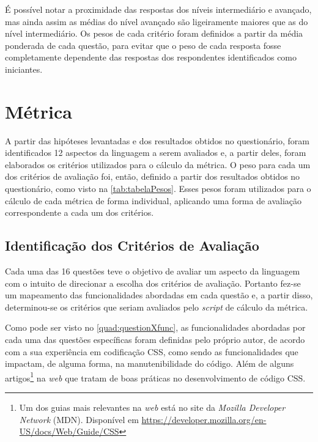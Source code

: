 É possível notar a proximidade das respostas dos níveis intermediário e avançado, mas ainda assim as médias do nível avançado são ligeiramente maiores que as do nível intermediário. Os pesos de cada critério foram definidos a partir da média ponderada de cada questão, para evitar que o peso de cada resposta fosse completamente dependente das respostas dos respondentes identificados como iniciantes.

\section{Métrica}
	
A partir das hipóteses levantadas e dos resultados obtidos no questionário, foram identificados 12 aspectos da linguagem a serem avaliados e, a partir deles, foram elaborados os critérios utilizados para o cálculo da métrica. O peso para cada um dos critérios de avaliação foi, então, definido a partir dos resultados obtidos no questionário, como visto na \autoref{tab:tabelaPesos}. Esses pesos foram utilizados para o cálculo de cada métrica de forma individual, aplicando uma forma de avaliação correspondente a cada um dos critérios.



\subsection{Identificação dos Critérios de Avaliação}
  
Cada uma das 16 questões teve o objetivo de avaliar um aspecto da linguagem com o intuito de direcionar a escolha dos critérios de avaliação. Portanto fez-se um mapeamento das funcionalidades abordadas em cada questão e, a partir disso, determinou-se os critérios que seriam avaliados pelo \textit{script} de cálculo da métrica.

Como pode ser visto no \autoref{quad:questionXfunc}, as funcionalidades abordadas por cada uma das questões específicas foram definidas pelo próprio autor, de acordo com a sua experiência em codificação CSS, como sendo as funcionalidades que impactam, de alguma forma, na manutenibilidade do código. Além de alguns artigos\footnote{Um dos guias mais relevantes na \textit{web} está no site da \textit{Mozilla Developer Network} (MDN). Disponível em \url{https://developer.mozilla.org/en-US/docs/Web/Guide/CSS}} na \textit{web} que tratam de boas práticas no desenvolvimento de código CSS.

